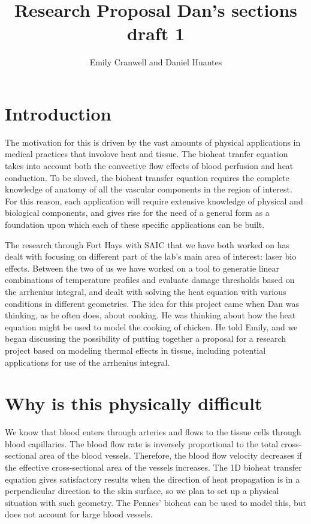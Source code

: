 \documentclass[12pt]{article}
\begin{document}
\title{Research Proposal
\large Dan's sections draft 1}
\author{Emily Cranwell and Daniel Huantes}
\maketitle
\section{Introduction}

\indent The motivation for this is driven by the vast amounts of physical applications in medical practices that involove heat and tissue. The bioheat tranfer equation takes into account both the convective flow effects of blood perfusion and heat conduction. To be sloved, the bioheat transfer equation requires the complete knowledge of anatomy of all the vascular components in the region of interest. For this reason, each application will require extensive knowledge of physical and biological components, and gives rise for the need of a general form as a foundation upon which each of these specific applications can be built. 

The research through Fort Hays with SAIC that we have both worked on has dealt with focusing on different part of the lab's main area of interest: laser bio effects. Between the two of us  we have worked on a tool to generatie linear combinations of temperature profiles and evaluate damage thresholds based on the arrhenius integral, and dealt with solving the heat equation with various conditions in different geometries. The idea for this project came when Dan was thinking, as he often does, about cooking. He was thinking about how the heat equation might be used to model the cooking of chicken. He told Emily, and we began discussing the possibility of putting together a proposal for a research project based on modeling thermal effects in tissue, including potential applications for use of the arrhenius integral.
\section{Why is this physically difficult}

\indent We know that blood enters through arteries and flows to the tissue cells through blood capillaries. The blood flow rate is inversely proportional to the total cross-sectional area of the blood vessels. Therefore, the blood flow velocity decreases if the effective cross-sectional area of the vessels increases. The 1D bioheat transfer equation gives satisfactory results when the direction of heat propagation is in a perpendicular direction to the skin surface, so we plan to set up a physical situation with such geometry. The Pennes' bioheat can be used to model this, but does not account for large blood vessels. 
	
\end{document}
